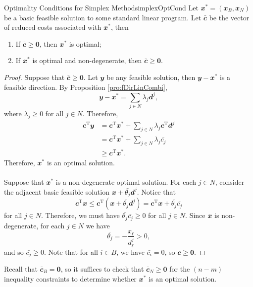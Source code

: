 \documentclass[math, code]{amznotes}
\theoremstyle{remark}
\begin{document}
\begin{thmbox}{Optimality Conditions for Simplex Method}{simplexOptCond}
    Let $\mathbfit{x}^* = \left(\mathbfit{x}_B, \mathbfit{x}_N\right)$ be a basic feasible solution to some standard linear program. Let $\mathbfit{\bar{c}}$ be the vector of reduced costs associated with $\mathbfit{x}^*$, then 
    \begin{enumerate}
        \item If $\mathbfit{\bar{c}} \geq \mathbf{0}$, then $\mathbfit{x}^*$ is optimal;
        \item If $\mathbfit{x}^*$ is optimal and non-degenerate, then $\mathbfit{\bar{c}} \geq \mathbf{0}$.
    \end{enumerate}
    \tcblower
    \begin{proof}
        Suppose that $\mathbfit{\bar{c}} \geq \mathbf{0}$. Let $\mathbfit{y}$ be any feasible solution, then $\mathbfit{y - x}^*$ is a feasible direction. By Proposition \ref{pro:fDirLinCombi}, 
        \begin{equation*}
            \mathbfit{y - x}^* = \sum_{j \in N}\lambda_j\mathbfit{d}^j,
        \end{equation*}
        where $\lambda_j \geq 0$ for all $j \in N$. Therefore,
        \begin{align*}
            \mathbfit{c}^{\mathrm{T}}\mathbfit{y} & = \mathbfit{c}^{\mathrm{T}}\mathbfit{x}^* + \sum_{j \in N}\lambda_j\mathbfit{c}^{\mathrm{T}}\mathbfit{d}^j \\
            & = \mathbfit{c}^{\mathrm{T}}\mathbfit{x}^* + \sum_{j \in N}\lambda_j\bar{c_j} \\
            & \geq \mathbfit{c}^{\mathrm{T}}\mathbfit{x}^*.
        \end{align*}
        Therefore, $\mathbfit{x}^*$ is an optimal solution.
        \\\\
        Suppose that $\mathbfit{x}^*$ is a non-degenerate optimal solution. For each $j \in N$, consider the adjacent basic feasible solution $\mathbfit{x} + \bar{\theta_j}\mathbfit{d}^j$. Notice that 
        \begin{equation*}
            \mathbfit{c}^{\mathrm{T}}\mathbfit{x} \leq \mathbfit{c}^{\mathrm{T}}\left(\mathbfit{x} + \bar{\theta_j}\mathbfit{d}^j\right) = \mathbfit{c}^{\mathrm{T}}\mathbfit{x} + \bar{\theta_j}\bar{c_j}
        \end{equation*}
        for all $j \in N$. Therefore, we must have $\bar{\theta_j}\bar{c_j} \geq 0$ for all $j \in N$. Since $\mathbfit{x}$ is non-degenerate, for each $j \in N$ we have 
        \begin{equation*}
            \bar{\theta_j} = -\frac{x_{\ell}}{d^j_{\ell}} > 0,
        \end{equation*}
        and so $\bar{c_j} \geq 0$. Note that for all $i \in B$, we have $\bar{c_i} = 0$, so $\mathbfit{\bar{c}} \geq \mathbf{0}$.
    \end{proof}
\end{thmbox}
Recall that $\mathbfit{\bar{c}}_B = \mathbf{0}$, so it suffices to check that $\mathbfit{\bar{c}}_N \geq \mathbf{0}$ for the $(n - m)$ inequality constraints to determine whether $\mathbfit{x}^*$ is an optimal solution.
\end{document}
